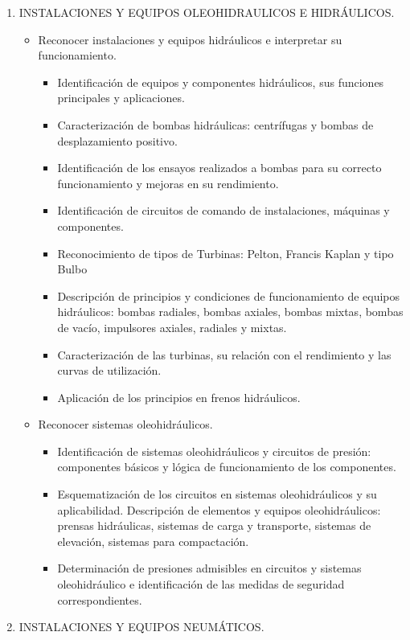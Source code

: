 \documentclass[planificacion.tex]{subfiles}
\begin{document}
\begin{enumerate}
\begin{itemize}
    \end{itemize}
    
\item INSTALACIONES Y EQUIPOS OLEOHIDRAULICOS E HIDRÁULICOS.
    \begin{itemize}
        \item Reconocer instalaciones y
equipos hidráulicos e
interpretar su funcionamiento.
    \begin{itemize}
         \item Identificación de equipos y componentes hidráulicos,
sus funciones principales y aplicaciones.
\item Caracterización de bombas hidráulicas: centrífugas y
bombas de desplazamiento positivo.
\item Identificación de los ensayos realizados a bombas
para su correcto funcionamiento y mejoras en su
rendimiento.
\item Identificación de circuitos de comando de
instalaciones, máquinas y componentes.
\item Reconocimiento de tipos de Turbinas: Pelton, Francis
Kaplan y tipo Bulbo
\item Descripción de principios y condiciones de
funcionamiento de equipos hidráulicos: bombas
radiales, bombas axiales, bombas mixtas, bombas de
vacío, impulsores axiales, radiales y mixtas.
\item Caracterización de las turbinas, su relación con el
rendimiento y las curvas de utilización.
\item Aplicación de los principios en frenos hidráulicos. 
    \end{itemize}
        \item Reconocer sistemas oleohidráulicos.
    \begin{itemize}
        \item Identificación de sistemas oleohidráulicos y circuitos
de presión: componentes básicos y lógica de
funcionamiento de los componentes.
\item Esquematización de los circuitos en sistemas oleohidráulicos y su aplicabilidad.
 Descripción de elementos y equipos oleohidráulicos:
prensas hidráulicas, sistemas de carga y transporte,
sistemas de elevación, sistemas para compactación.
\item Determinación de presiones admisibles en circuitos y
sistemas oleohidráulico e identificación de las medidas
de seguridad correspondientes.
    \end{itemize}
    \end{itemize}
    \item INSTALACIONES Y EQUIPOS NEUMÁTICOS. 

\end{enumerate}
\end{document}
